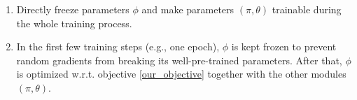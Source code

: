 \begin{enumerate}
    \item Directly freeze parameters $\phi$ and make parameters $(\pi, \theta)$ trainable during the whole training process.
    \item In the first few training steps (e.g., one epoch), $\phi$ is kept frozen to prevent random gradients from breaking its well-pre-trained parameters. After that, $\phi$ is optimized w.r.t. objective \ref{our_objective} together with the other modules $(\pi, \theta)$.
\end{enumerate}


\fi